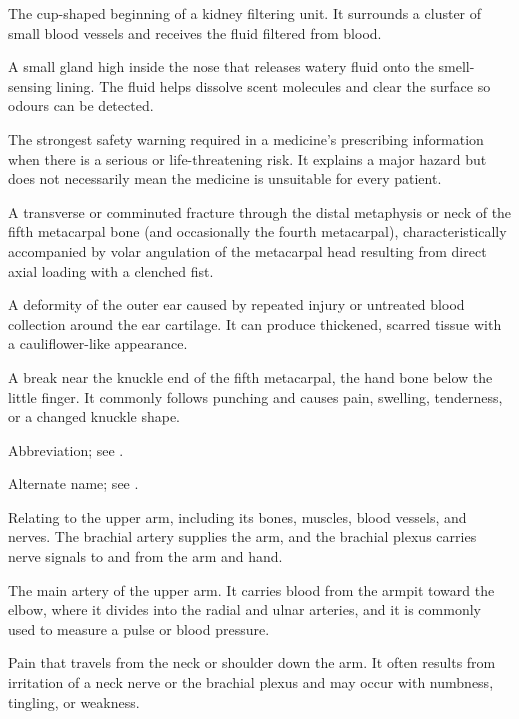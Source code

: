  The cup-shaped beginning of a kidney filtering unit. It surrounds a cluster of small blood vessels and receives the fluid filtered from blood.

 A small gland high inside the nose that releases watery fluid onto the smell-sensing lining. The fluid helps dissolve scent molecules and clear the surface so odours can be detected.

 The strongest safety warning required in a medicine's prescribing information when there is a serious or life-threatening risk. It explains a major hazard but does not necessarily mean the medicine is unsuitable for every patient.

 A transverse or comminuted fracture through the distal metaphysis or neck of the fifth metacarpal bone (and occasionally the fourth metacarpal), characteristically accompanied by volar angulation of the metacarpal head resulting from direct axial loading with a clenched fist.

 A deformity of the outer ear caused by repeated injury or untreated blood collection around the ear cartilage. It can produce thickened, scarred tissue with a cauliflower-like appearance.

 A break near the knuckle end of the fifth metacarpal, the hand bone below the little finger. It commonly follows punching and causes pain, swelling, tenderness, or a changed knuckle shape.

 Abbreviation; see .

 Alternate name; see .

 Relating to the upper arm, including its bones, muscles, blood vessels, and nerves. The brachial artery supplies the arm, and the brachial plexus carries nerve signals to and from the arm and hand.

 The main artery of the upper arm. It carries blood from the armpit toward the elbow, where it divides into the radial and ulnar arteries, and it is commonly used to measure a pulse or blood pressure.

 Pain that travels from the neck or shoulder down the arm. It often results from irritation of a neck nerve or the brachial plexus and may occur with numbness, tingling, or weakness.

